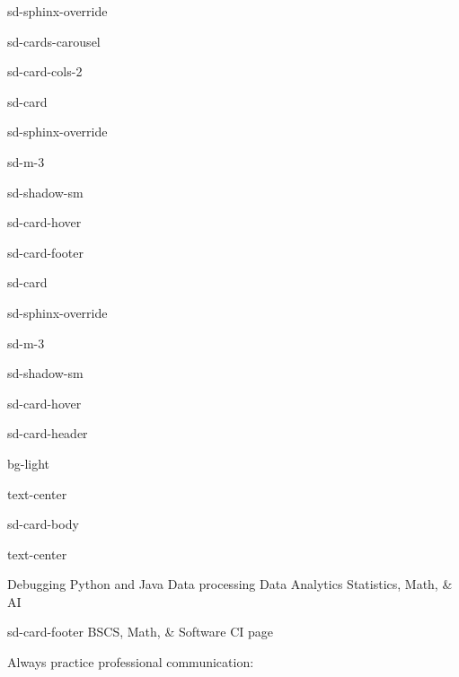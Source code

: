 \documentclass[letterpaper,10pt,english]{jupyterBook}
\let\sphinxpxdimen\pdfpxdimen\else\newdimen\sphinxpxdimen
\begin{document}
\begin{sphinxuseclass}{sd-sphinx-override}
\begin{sphinxuseclass}{sd-cards-carousel}
\begin{sphinxuseclass}{sd-card-cols-2}
\begin{sphinxuseclass}{sd-card}
\begin{sphinxuseclass}{sd-sphinx-override}
\begin{sphinxuseclass}{sd-m-3}
\begin{sphinxuseclass}{sd-shadow-sm}
\begin{sphinxuseclass}{sd-card-hover}
\begin{sphinxuseclass}{sd-card-footer}
\end{sphinxuseclass}
\end{sphinxuseclass}
\end{sphinxuseclass}
\end{sphinxuseclass}
\end{sphinxuseclass}
\end{sphinxuseclass}
\begin{sphinxuseclass}{sd-card}
\begin{sphinxuseclass}{sd-sphinx-override}
\begin{sphinxuseclass}{sd-m-3}
\begin{sphinxuseclass}{sd-shadow-sm}
\begin{sphinxuseclass}{sd-card-hover}
\begin{sphinxuseclass}{sd-card-header}
\begin{sphinxuseclass}{bg-light}
\begin{sphinxuseclass}{text-center}
\sphinxAtStartPar
{}

\end{sphinxuseclass}
\end{sphinxuseclass}
\end{sphinxuseclass}
\begin{sphinxuseclass}{sd-card-body}
\begin{sphinxuseclass}{text-center}
\noindent\sphinxincludegraphics[height=100\sphinxpxdimen]{{debug1}.jpg}

\sphinxAtStartPar
Debugging Python and Java 
Data processing 
Data Analytics 
Statistics, Math, \& AI

\end{sphinxuseclass}
\end{sphinxuseclass}
\begin{sphinxuseclass}{sd-card-footer}
\sphinxAtStartPar
BSCS, Math, \& Software CI page 

\end{sphinxuseclass}
\end{sphinxuseclass}
\end{sphinxuseclass}
\end{sphinxuseclass}
\end{sphinxuseclass}
\end{sphinxuseclass}
\end{sphinxuseclass}
\end{sphinxuseclass}
\end{sphinxuseclass}
\sphinxAtStartPar
Always practice professional communication:
\end{document}
